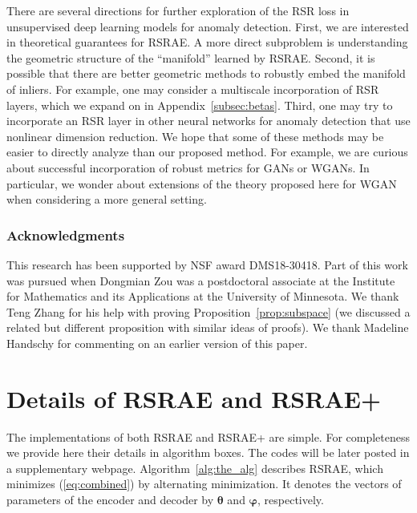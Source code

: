 \documentclass{article} \usepackage{iclr2020_conference,times}
\def\eqref#1{(\ref{#1})}
\def\vtheta{{\bm{\theta}}}
\def\vvarphi{{\bm{\varphi}}}
\begin{document}
There are several directions for further exploration of the RSR loss in unsupervised deep learning models for anomaly detection. First, we are interested in theoretical guarantees for RSRAE. A more direct subproblem is understanding the geometric structure of the ``manifold'' learned by RSRAE. 
Second, it is possible that there are better geometric methods to robustly embed the manifold of inliers. For example, one may consider a multiscale incorporation of RSR layers, which we expand on in Appendix~\ref{subsec:betas}.
Third, one may try to incorporate an RSR layer in other neural networks for anomaly detection that use nonlinear dimension reduction. We hope that some of these methods may be easier to directly analyze than our proposed method. For example, we are curious about successful incorporation of robust metrics for GANs or WGANs. In particular, we wonder about extensions of the theory proposed here for WGAN when considering a more general setting.

\subsubsection*{Acknowledgments}
\label{subsubsec: acknowledgement}
This research has been supported by NSF award DMS18-30418. Part of this work was pursued when Dongmian Zou was a postdoctoral associate at the Institute for Mathematics and its Applications at the University of Minnesota. We thank Teng Zhang for his help with proving
Proposition~\ref{prop:subspace} (we discussed a related but different proposition with similar ideas of proofs). We thank Madeline
Handschy for commenting on an earlier version of this paper. 








\newpage

\appendix


\section{Details of RSRAE and RSRAE+}
\label{sec:alg}

The implementations of both RSRAE and RSRAE+ are simple. For completeness we provide here their details in algorithm boxes. The codes will be later posted in a supplementary webpage.  Algorithm~\ref{alg:the_alg} describes RSRAE, which minimizes \eqref{eq:combined} by alternating minimization. It denotes the vectors of parameters of the encoder and decoder by $\vtheta$ and $\vvarphi$, respectively.
\end{document}
